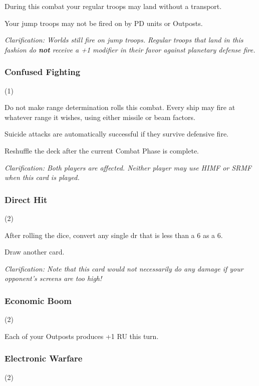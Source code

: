 During this combat your regular troops may land without a transport.

Your jump troops may not be fired on by PD units or Outposts.

\textit{Clarification: Worlds still fire on jump troops. Regular troops that land in this fashion do \textbf{not} receive a +1 modifier in their favor against planetary defense fire.}

\subsubsection{Confused Fighting} (1)


Do not make range determination rolls this combat. Every ship may fire at whatever range it wishes, using either missile or beam factors.

Suicide attacks are automatically successful if they survive defensive fire.

Reshuffle the deck after the current Combat Phase is complete.

\textit{Clarification: Both players are affected. Neither player may use HIMF or SRMF when this card is played.}

\subsubsection{Direct Hit} (2)


After rolling the dice, convert any single dr that is less than a 6 as a 6.

Draw another card.

\textit{Clarification: Note that this card would not necessarily do any damage if your opponent's screens are too high!}

\subsubsection{Economic Boom} (2)


Each of your Outposts produces +1 RU this turn.

\subsubsection{Electronic Warfare} (2)

